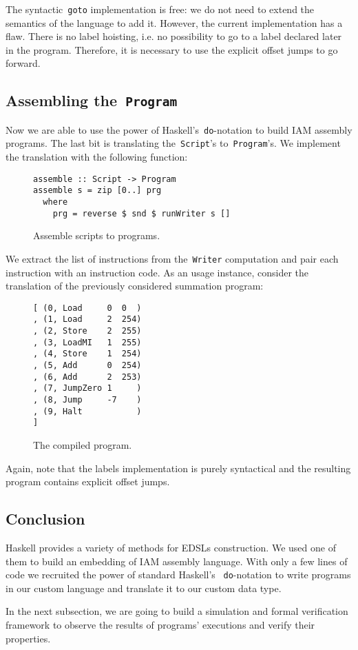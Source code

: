 The syntactic~\texttt{goto} implementation is free: we do not need
to extend the semantics of the language to add it. However, the current implementation
has a flaw. There is no label hoisting, i.e. no possibility to go to a label declared later
in the program. Therefore, it is necessary to use the explicit offset jumps to
go forward.

\subsection{Assembling the~\texttt{Program}}

Now we are able to use the power of Haskell's~\texttt{do}-notation to
build IAM assembly programs. The last bit is translating
the~\texttt{Script}'s to~\texttt{Program}'s. We implement the
translation with the following function:

\begin{figure}[H]
\begin{verbatim}
assemble :: Script -> Program
assemble s = zip [0..] prg
  where
    prg = reverse $ snd $ runWriter s []
\end{verbatim}
\caption{Assemble scripts to programs.}
\end{figure}

We extract the list of instructions from the~\texttt{Writer} computation
and pair each instruction with an instruction code. As an usage instance, consider the
translation of the previously considered summation program:

\begin{figure}[H]
\begin{verbatim}
[ (0, Load     0  0  )
, (1, Load     2  254)
, (2, Store    2  255)
, (3, LoadMI   1  255)
, (4, Store    1  254)
, (5, Add      0  254)
, (6, Add      2  253)
, (7, JumpZero 1     )
, (8, Jump     -7    )
, (9, Halt           )
]
\end{verbatim}
\caption{The compiled program.}
\end{figure}

Again, note that the labels implementation is purely syntactical and the resulting
program contains explicit offset jumps.

\subsection{Conclusion}

Haskell provides a variety of methods for EDSLs construction.
We used one of them to build an embedding of IAM assembly language.
With only a few lines of code we recruited the power of standard Haskell's
~\texttt{do}-notation to write programs in our custom language and
translate it to our custom data type.

In the next subsection, we are going to build a simulation and formal verification
framework to observe the results of programs' executions and verify their properties.